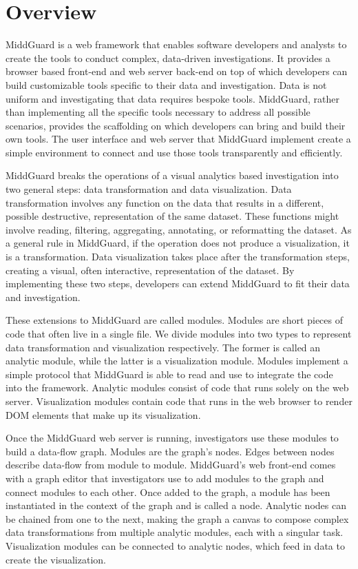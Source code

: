 \documentclass[midd]{thesis}
\begin{document}
\section{Overview}

MiddGuard is a web framework that enables software developers and analysts to
create the tools to conduct complex, data-driven investigations. It provides a
browser based front-end and web server back-end on top of which developers can
build customizable tools specific to their data and investigation. Data is not
uniform and investigating that data requires bespoke tools. MiddGuard,
rather than implementing all the specific tools necessary to address all
possible scenarios, provides the scaffolding on which developers can bring and
build their own tools. The user interface and web server that MiddGuard
implement create a simple environment to connect and use those tools
transparently and efficiently.

MiddGuard breaks the operations of a visual analytics based investigation into
two general steps: data transformation and data visualization. Data
transformation involves any function on the data that results in a different,
possible destructive, representation of the same dataset. These functions might
involve reading, filtering, aggregating, annotating, or reformatting the
dataset. As a general rule in MiddGuard, if the operation does not produce a
visualization, it is a transformation. Data visualization takes place after the
transformation steps, creating a visual, often interactive, representation of
the dataset. By implementing these two steps, developers can extend MiddGuard to
fit their data and investigation.

These extensions to MiddGuard are called modules. Modules are short pieces of
code that often live in a single file. We divide modules into two types to
represent data transformation and visualization respectively. The former is
called an analytic module, while the latter is a visualization module. Modules
implement a simple protocol that MiddGuard is able to read and use to integrate
the code into the framework. Analytic modules consist of code that runs solely
on the web server. Visualization modules contain code that runs in the web
browser to render DOM elements that make up its visualization.

Once the MiddGuard web server is running, investigators use these modules to
build a data-flow graph. Modules are the graph's nodes. Edges between nodes
describe data-flow from module to module. MiddGuard's web front-end comes with a
graph editor that investigators use to add modules to the graph and connect
modules to each other. Once added to the graph, a module has been instantiated
in the context of the graph and is called a node. Analytic nodes can be chained
from one to the next, making the graph a canvas to compose complex data
transformations from multiple analytic modules, each with a singular task.
Visualization modules can be connected to analytic nodes, which feed in data to
create the visualization.
\end{document}
